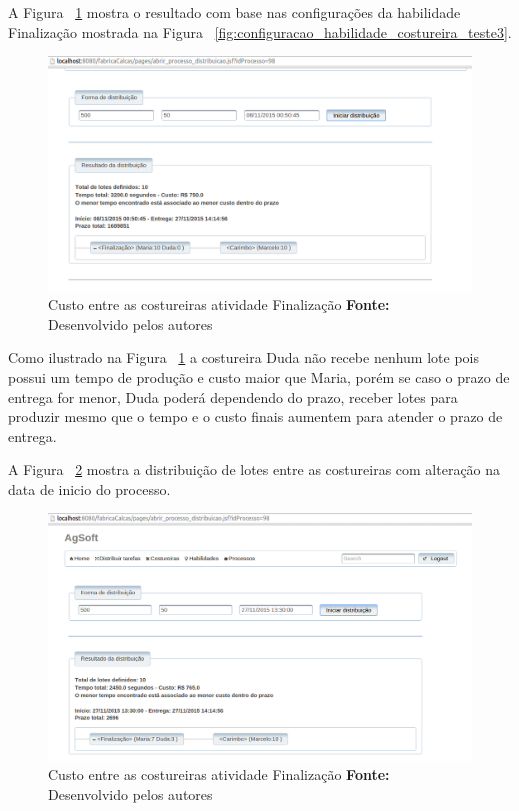 \par A Figura ~\ref{fig:resultado1_teste3} mostra o resultado
com base nas configurações da habilidade Finalização mostrada na Figura
~\ref{fig:configuracao_habilidade_costureira_teste3}.

\begin{figure}[h!]
	\centerline{\includegraphics[scale=0.4]{./imagens/resultado1_teste3.png}}
	\caption[Custo entre as costureiras atividade Finalização]
	{Custo entre as costureiras atividade Finalização \textbf{Fonte:} Desenvolvido pelos autores}
	\label{fig:resultado1_teste3}
\end{figure}

\par Como ilustrado na Figura ~\ref{fig:resultado1_teste3} a costureira Duda não
recebe nenhum lote pois possui um tempo de produção e custo maior que Maria,
porém se caso o prazo de entrega for menor, Duda poderá dependendo do prazo,
receber lotes para produzir mesmo que o tempo e o custo finais aumentem para
atender o prazo de entrega.

A Figura ~\ref{fig:resultado2_teste3} mostra a distribuição de lotes entre as
costureiras com alteração na data de inicio do processo.

\begin{figure}[h!]
	\centerline{\includegraphics[scale=0.4]{./imagens/resultado2_teste3.png}}
	\caption[Custo entre as costureiras atividade Finalização]
	{Custo entre as costureiras atividade Finalização \textbf{Fonte:} Desenvolvido pelos autores}
	\label{fig:resultado2_teste3}
\end{figure}

